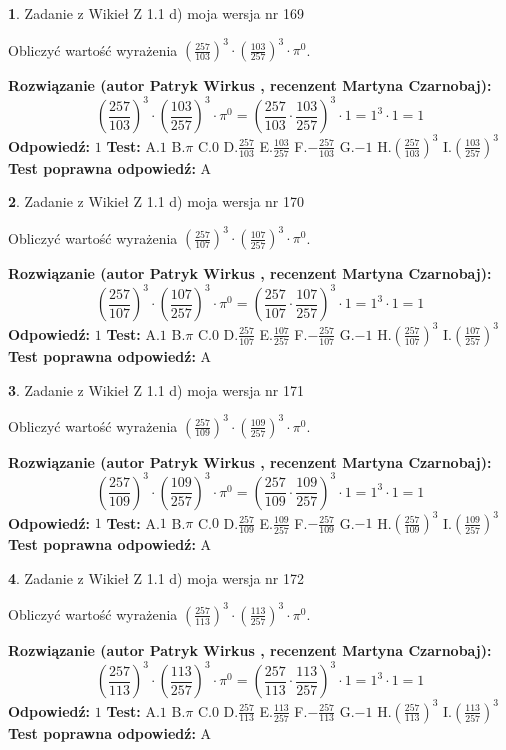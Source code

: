 \documentclass[12pt, a4paper]{article}
\theoremstyle{definition} %
\newtheorem{zad}{}
\newcommand{\zadStart}[1]{\begin{zad}#1\newline}
\newcommand{\zadStop}{\end{zad}}
\newcommand{\rozwStart}[2]{\noindent \textbf{Rozwiązanie (autor #1 , recenzent #2): }\newline}
\newcommand{\rozwStop}{\newline}
\newcommand{\odpStart}{\noindent \textbf{Odpowiedź:}\newline}
\newcommand{\odpStop}{\newline}
\newcommand{\testStart}{\noindent \textbf{Test:}\newline}
\newcommand{\testStop}{\newline}
\newcommand{\kluczStart}{\noindent \textbf{Test poprawna odpowiedź:}\newline}
\newcommand{\kluczStop}{\newline}
\begin{document}
\zadStart{Zadanie z Wikieł Z 1.1 d) moja wersja nr 169}

Obliczyć wartość wyrażenia $(\frac{257}{103})^{3} \cdot (\frac{103}{257})^{3} \cdot \pi^{0}$.
\zadStop
\rozwStart{Patryk Wirkus}{Martyna Czarnobaj}
$$(\frac{257}{103})^{3} \cdot (\frac{103}{257})^{3} \cdot \pi^{0} = (\frac{257}{103} \cdot \frac{103}{257})^{3} \cdot 1 = 1^{3} \cdot 1 = 1$$
\rozwStop
\odpStart
$1$
\odpStop
\testStart
A.$1$ B.$\pi$ C.$0$ D.$\frac{257}{103}$ E.$\frac{103}{257}$
F.$-\frac{257}{103}$ G.$-1$
H.$(\frac{257}{103})^{3}$
I.$(\frac{103}{257})^{3}$
\testStop
\kluczStart
A
\kluczStop



\zadStart{Zadanie z Wikieł Z 1.1 d) moja wersja nr 170}

Obliczyć wartość wyrażenia $(\frac{257}{107})^{3} \cdot (\frac{107}{257})^{3} \cdot \pi^{0}$.
\zadStop
\rozwStart{Patryk Wirkus}{Martyna Czarnobaj}
$$(\frac{257}{107})^{3} \cdot (\frac{107}{257})^{3} \cdot \pi^{0} = (\frac{257}{107} \cdot \frac{107}{257})^{3} \cdot 1 = 1^{3} \cdot 1 = 1$$
\rozwStop
\odpStart
$1$
\odpStop
\testStart
A.$1$ B.$\pi$ C.$0$ D.$\frac{257}{107}$ E.$\frac{107}{257}$
F.$-\frac{257}{107}$ G.$-1$
H.$(\frac{257}{107})^{3}$
I.$(\frac{107}{257})^{3}$
\testStop
\kluczStart
A
\kluczStop



\zadStart{Zadanie z Wikieł Z 1.1 d) moja wersja nr 171}

Obliczyć wartość wyrażenia $(\frac{257}{109})^{3} \cdot (\frac{109}{257})^{3} \cdot \pi^{0}$.
\zadStop
\rozwStart{Patryk Wirkus}{Martyna Czarnobaj}
$$(\frac{257}{109})^{3} \cdot (\frac{109}{257})^{3} \cdot \pi^{0} = (\frac{257}{109} \cdot \frac{109}{257})^{3} \cdot 1 = 1^{3} \cdot 1 = 1$$
\rozwStop
\odpStart
$1$
\odpStop
\testStart
A.$1$ B.$\pi$ C.$0$ D.$\frac{257}{109}$ E.$\frac{109}{257}$
F.$-\frac{257}{109}$ G.$-1$
H.$(\frac{257}{109})^{3}$
I.$(\frac{109}{257})^{3}$
\testStop
\kluczStart
A
\kluczStop



\zadStart{Zadanie z Wikieł Z 1.1 d) moja wersja nr 172}

Obliczyć wartość wyrażenia $(\frac{257}{113})^{3} \cdot (\frac{113}{257})^{3} \cdot \pi^{0}$.
\zadStop
\rozwStart{Patryk Wirkus}{Martyna Czarnobaj}
$$(\frac{257}{113})^{3} \cdot (\frac{113}{257})^{3} \cdot \pi^{0} = (\frac{257}{113} \cdot \frac{113}{257})^{3} \cdot 1 = 1^{3} \cdot 1 = 1$$
\rozwStop
\odpStart
$1$
\odpStop
\testStart
A.$1$ B.$\pi$ C.$0$ D.$\frac{257}{113}$ E.$\frac{113}{257}$
F.$-\frac{257}{113}$ G.$-1$
H.$(\frac{257}{113})^{3}$
I.$(\frac{113}{257})^{3}$
\testStop
\kluczStart
A
\kluczStop
\end{document}
